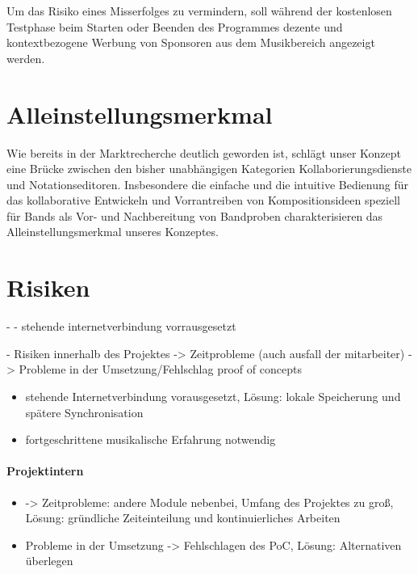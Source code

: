 \documentclass[12pt]{scrartcl}
\begin{document}
Um das Risiko eines Misserfolges zu vermindern, soll während der kostenlosen Testphase beim Starten oder Beenden des Programmes dezente und kontextbezogene Werbung von Sponsoren aus dem Musikbereich angezeigt werden.



\section{Alleinstellungsmerkmal}

Wie bereits in der Marktrecherche deutlich geworden ist, schlägt unser Konzept eine Brücke zwischen den bisher unabhängigen Kategorien Kollaborierungsdienste und Notationseditoren. Insbesondere die einfache und die intuitive Bedienung für das kollaborative Entwickeln und Vorrantreiben von Kompositionsideen speziell für Bands als Vor- und Nachbereitung von Bandproben charakterisieren das Alleinstellungsmerkmal unseres Konzeptes.


\section{Risiken}


- 
- stehende internetverbindung vorrausgesetzt

- Risiken innerhalb des Projektes
-> Zeitprobleme (auch ausfall der mitarbeiter)
-> Probleme in der Umsetzung/Fehlschlag proof of concepts
\begin{itemize}
\item stehende Internetverbindung vorausgesetzt, Lösung: lokale Speicherung und spätere Synchronisation
\item fortgeschrittene musikalische Erfahrung notwendig
\end{itemize}


\paragraph{Projektintern}

\begin{itemize}

\item -> Zeitprobleme: andere Module nebenbei, Umfang des Projektes zu groß, Lösung: gründliche Zeiteinteilung und kontinuierliches Arbeiten
\item Probleme in der Umsetzung -> Fehlschlagen des PoC, Lösung: Alternativen überlegen

\end{itemize}
\end{document}

